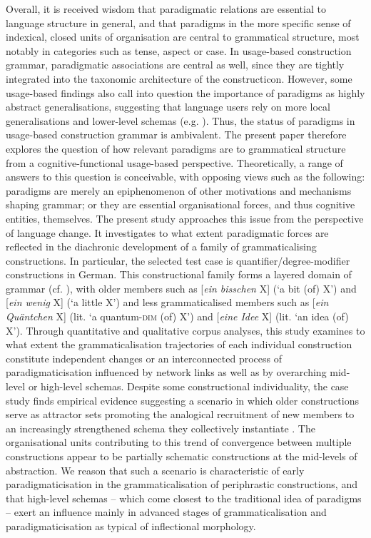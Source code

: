 \documentclass[output=paper]{langsci/langscibook}
\begin{document}
Overall, it is received wisdom that paradigmatic relations are essential to language structure in general, and that paradigms in the more specific sense of indexical, closed units of organisation are central to grammatical structure, most notably in categories such as tense, aspect or case. In usage-based construction grammar, paradigmatic associations are central as well, since they are tightly integrated into the taxonomic architecture of the constructicon. However, some usage\hyp{}based findings also call into question the importance of paradigms as highly abstract generalisations, suggesting that language users rely on more local generalisations and lower-level schemas (e.g. \cites[]{Boas2003}[]{Dabrowska2008}[Ch. 5]{PerekArgumentstructureusagebased2015}[]{Schmiddynamicslinguisticsystem2020}). Thus, the status of paradigms in usage-based construction grammar is ambivalent. 
The present paper therefore explores the question of how relevant paradigms are to grammatical structure from a cognitive-functional usage-based perspective. Theoretically, a range of answers to this question is conceivable, with opposing views such as the following: paradigms are merely an epiphenomenon of other motivations and mechanisms shaping grammar; or they are essential organisational forces, and thus cognitive entities, themselves. The present study approaches this issue from the perspective of language change. It investigates to what extent paradigmatic forces are reflected in the diachronic development of a family of grammaticalising constructions. In particular, the selected test case is quantifier\slash degree\hyp{}modifier constructions in German. This constructional family forms a layered domain of grammar (cf. \citealt{Hopperprinciplesgrammaticalization1991}), with older members such as [\textit{ein bisschen} X] (‘a bit (of) X’) and [\textit{ein wenig} X] (‘a little X’) and less grammaticalised members such as [\textit{ein Quäntchen} X] (lit. ‘a quantum-\textsc{dim} (of) X’) and [\textit{eine Idee} X] (lit. ‘an idea (of) X’). Through quantitative and qualitative corpus analyses, this study examines to what extent the grammaticalisation trajectories of each individual construction constitute independent changes or an interconnected process of paradigmaticisation influenced by network links as well as by overarching mid-level or high-level schemas. Despite some constructional individuality, the case study finds empirical evidence suggesting a scenario in which older constructions serve as attractor sets promoting the analogical recruitment of new members to an increasingly strengthened schema they collectively instantiate \citep[cf., e.g.,][]{Amit1989, TraugottGrammaticalizationNPNP2008, VerveckkenBinominalquantifiersSpanish2015, Aaron2016, DeSmet2017}. The organisational units contributing to this trend of convergence between multiple constructions appear to be partially schematic constructions at the mid-levels of abstraction. We reason that such a scenario is characteristic of early paradigmaticisation in the grammaticalisation of periphrastic constructions, and that high-level schemas – which come closest to the traditional idea of paradigms – exert an influence mainly in advanced stages of grammaticalisation and paradigmaticisation as typical of inflectional morphology.
\end{document}
